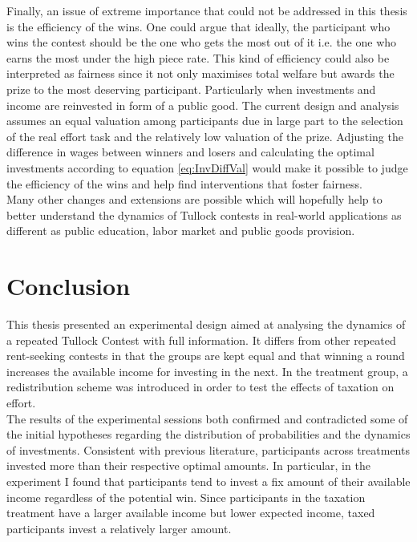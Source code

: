 Finally, an issue of extreme importance that could not be addressed in this thesis is the efficiency of the wins. One could argue that ideally, the participant who wins the contest should be the one who gets the most out of it i.e. the one who earns the most under the high piece rate. This kind of efficiency could also be interpreted as fairness since it not only maximises total welfare but awards the prize to the most deserving participant. Particularly when investments and income are reinvested in form of a public good. The current design and analysis assumes an equal valuation among participants due in large part to the selection of the real effort task and the relatively low valuation of the prize. Adjusting the difference in wages between winners and losers and calculating the optimal investments according to equation \ref{eq:InvDiffVal} would make it possible to judge the efficiency of the wins and help find interventions that foster fairness.\\

Many other changes and extensions are possible which will hopefully help to better understand the dynamics of Tullock contests in real-world applications as different as public education, labor market and public goods provision.\\

\chapter{Conclusion}
\label{ch:conclusion}

This thesis presented an experimental design aimed at analysing the dynamics of a repeated Tullock Contest with full information. It differs from other repeated rent-seeking contests in that the groups are kept equal and that winning a round increases the available income for investing in the next.  In the treatment group, a redistribution scheme was introduced in order to test the effects of taxation on effort.\\

The results of the experimental sessions both confirmed and contradicted some of the initial hypotheses regarding the distribution of probabilities and the dynamics of investments. Consistent with previous literature, participants across treatments invested more than their respective optimal amounts. In particular, in the experiment I found that participants tend to invest a fix amount of their available income regardless of the potential win. Since participants in the taxation treatment have a larger available income but lower expected income, taxed participants invest a relatively larger amount.\\

